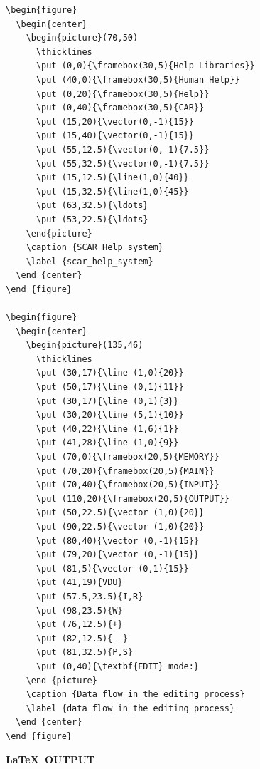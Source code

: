 \documentclass[11pt,twoside]{article}
\begin{document}
\small
\begin{verbatim}
\begin{figure}
  \begin{center}
    \begin{picture}(70,50)
      \thicklines
      \put (0,0){\framebox(30,5){Help Libraries}}
      \put (40,0){\framebox(30,5){Human Help}}
      \put (0,20){\framebox(30,5){Help}}
      \put (0,40){\framebox(30,5){CAR}}
      \put (15,20){\vector(0,-1){15}}
      \put (15,40){\vector(0,-1){15}}
      \put (55,12.5){\vector(0,-1){7.5}}
      \put (55,32.5){\vector(0,-1){7.5}}
      \put (15,12.5){\line(1,0){40}}
      \put (15,32.5){\line(1,0){45}}
      \put (63,32.5){\ldots}
      \put (53,22.5){\ldots}
    \end{picture}
    \caption {SCAR Help system}
    \label {scar_help_system}
  \end {center}
\end {figure}

\begin{figure}
  \begin{center}
    \begin{picture}(135,46)
      \thicklines
      \put (30,17){\line (1,0){20}}
      \put (50,17){\line (0,1){11}}
      \put (30,17){\line (0,1){3}}
      \put (30,20){\line (5,1){10}}
      \put (40,22){\line (1,6){1}}
      \put (41,28){\line (1,0){9}}
      \put (70,0){\framebox(20,5){MEMORY}}
      \put (70,20){\framebox(20,5){MAIN}}
      \put (70,40){\framebox(20,5){INPUT}}
      \put (110,20){\framebox(20,5){OUTPUT}}
      \put (50,22.5){\vector (1,0){20}}
      \put (90,22.5){\vector (1,0){20}}
      \put (80,40){\vector (0,-1){15}}
      \put (79,20){\vector (0,-1){15}}
      \put (81,5){\vector (0,1){15}}
      \put (41,19){VDU}
      \put (57.5,23.5){I,R}
      \put (98,23.5){W}
      \put (76,12.5){+}
      \put (82,12.5){--}
      \put (81,32.5){P,S}
      \put (0,40){\textbf{EDIT} mode:}
    \end {picture}
    \caption {Data flow in the editing process}
    \label {data_flow_in_the_editing_process}
  \end {center}
\end {figure}
\end{verbatim}
\normalsize

\newpage

\begin{center}
  \textbf{\LaTeX\ OUTPUT}
\end{center}
\end{document}
